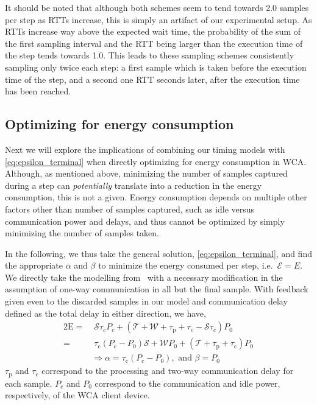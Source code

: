 It should be noted that although both schemes seem to tend towards \num{2.0} samples per step as \acp{RTT} increase, this is simply an artifact of our experimental setup.
As \acp{RTT} increase way above the expected wait time, the probability of the sum of the first sampling interval and the \ac{RTT} being larger than the execution time of the step tends towards \num{1.0}.
This leads to these sampling schemes consistently sampling only twice each step: a first sample which is taken before the execution time of the step, and a second one \ac{RTT} seconds later, after the execution time has been reached. 

\subsection{Optimizing for energy consumption}\label{ssec:optimization:energy}

Next we will explore the implications of combining our timing models with \cref{eq:epsilon_terminal} when directly optimizing for energy consumption in \ac{WCA}.
Although, as mentioned above, minimizing the number of samples captured during a step can \emph{potentially} translate into a reduction in the energy consumption, this is not a given.
Energy consumption depends on multiple other factors other than number of samples captured, such as idle versus communication power and delays, and thus cannot be optimized by simply minimizing the number of samples taken.

In the following, we thus take the general solution, \cref{eq:epsilon_terminal}, and find the appropriate \( \alpha \) and \( \beta \) to minimize the energy consumed per step, i.e.\ \( \mathcal{E}=E \).
We directly take the modelling from~\cite{Moothedath2022Aperiodic} with a necessary modification in the  assumption of one-way communication in all but the final sample.
With feedback given even to the discarded samples in our model and communication delay defined as the total delay in either direction, we have, 
\begin{alignat}{2}
    \mathrm{E}=&\;\mathcal{S}\tau_cP_c+(\mathcal{T}+\mathcal{W}+\tau_\mathrm{p}+\tau_\mathrm{c}-\mathcal{S}\tau_c)P_0\nonumber\\
    =&\;\tau_{\text{c}}(P_{\text{c}} -P_0)\mathcal{S}+\mathcal{W}P_0+(\mathcal{T}+\tau_{\text{p}} +\tau_{\text{c}}) P_0\nonumber\\
&\Rightarrow \alpha=\tau_{\text{c}}(P_{\text{c}} -P_0),\text{ and }\beta=P_0 \label{eq:optimization:energy}
\end{alignat}
\( \tau_\text{p} \) and \( \tau_\text{c} \) correspond to the processing and two-way communication delay for each sample.
\( P_\text{c} \) and \( P_0 \) correspond to the communication and idle power, respectively, of the \ac{WCA} client device.

